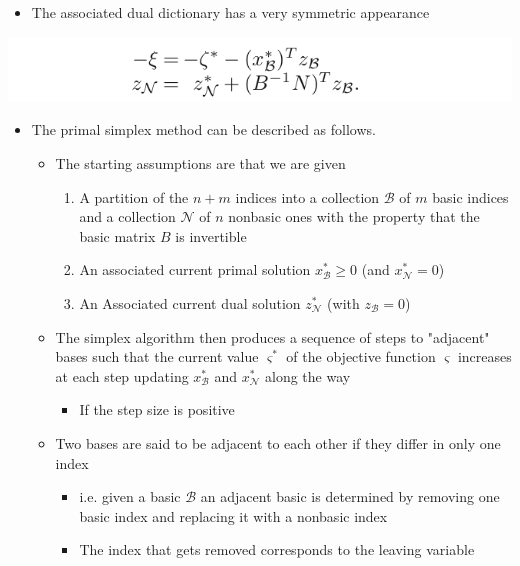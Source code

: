 \documentclass[11pt]{article}
\begin{document}
\begin{itemize}
\item The associated dual dictionary has a very symmetric appearance
\end{itemize}
\begin{center}
\includegraphics[width=.9\linewidth]{The Simplex Method in Matrix Notation/screenshot_2019-02-11_16-49-40.png}
\end{center}

\begin{itemize}
\item The primal simplex method can be described as follows.
\begin{itemize}
\item The starting assumptions are that we are given
\begin{enumerate}
\item A partition of the \(n+m\) indices into a collection \(\mathcal B\) of \(m\) basic indices and a collection \(\mathcal N\) of \(n\) nonbasic ones with the property that the basic matrix \(B\) is invertible
\item An associated current primal solution \(x_{\mathcal B}^* \geq 0\) (and \(x_{\mathcal N}^* = 0\))
\item An Associated current dual solution \(z_{\mathcal N}^*\) (with \(z_{\mathcal B} = 0\))
\end{enumerate}
\item The simplex algorithm then produces a sequence of steps to "adjacent" bases such that the current value \(\varsigma^*\) of the objective function \(\varsigma\) increases at each step updating \(x_{\mathcal B}^*\) and \(x_{\mathcal N}^*\) along the way
\begin{itemize}
\item If the step size is positive
\end{itemize}
\item Two bases are said to be adjacent to each other if they differ in only one index
\begin{itemize}
\item i.e. given a basic \(\mathcal B\) an adjacent basic is determined by removing one basic index and replacing it with a nonbasic index
\item The index that gets removed corresponds to the leaving variable
\end{itemize}

\end{itemize}
\end{itemize}
\end{document}
